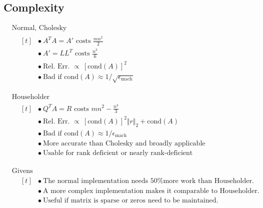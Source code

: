 \documentclass[12pt]{article}
\begin{document}
\newpage
\subsection{Complexity}

\vspace{10pt}
\(\begin{aligned}
	&\text{Normal, Cholesky}\\[5pt]
	&\hspace{10pt}\begin{aligned}[t]
		&\bullet\ A^TA = A' \text{\ \ costs\ \ } \tfrac{mn^2}{2}\\[2pt]
		&\bullet\ A' = LL^T \text{\ \ costs\ \ } \tfrac{n^3}{6}\\[2pt]
		&\bullet\ \text{Rel. Err. } \propto\ [\text{cond}(A)]^2\\[4pt]
		&\bullet\ \text{Bad if \ cond}(A) \approx 1/\sqrt{\epsilon_\text{mach}}
	\end{aligned}
\end{aligned}\)

\vspace{10pt}
\(\begin{aligned}
	&\text{Householder}\\[5pt]
	&\hspace{10pt}\begin{aligned}[t]
		&\bullet\ Q^TA = R \text{\ \ costs\ \ } mn^2 - \tfrac{n^3}{3} \\[2pt]
		&\bullet\ \text{Rel. Err. } \propto\ [\text{cond}(A)]^2 \Vert r \Vert_2 + \text{cond}(A)\\[4pt]
		&\bullet\ \text{Bad if \ cond}(A) \approx 1/\epsilon_\text{mach}\\[2pt]
		&\bullet\ \text{More accurate than Cholesky and broadly applicable}\\[2pt]
		&\bullet\ \text{Usable for rank deficient or nearly rank-deficient}
	\end{aligned}
\end{aligned}\)

\vspace{10pt}
\(\begin{aligned}
	&\text{Givens}\\[5pt]
	&\hspace{10pt}\begin{aligned}[t]
		&\bullet\ \text{The normal implementation needs 50\% more work than Householder.}\\[2pt]
		&\bullet\ \text{A more complex implementation makes it comparable to Householder.}\\[2pt]
		&\bullet\ \text{Useful if matrix is sparse or zeros need to be maintained.}
	\end{aligned}
\end{aligned}\)
\end{document}
